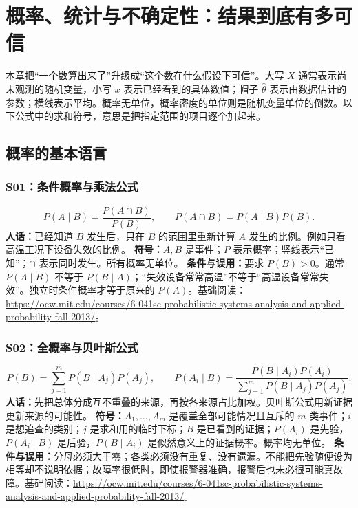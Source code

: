 \chapter{概率、统计与不确定性：结果到底有多可信}
本章把“一个数算出来了”升级成“这个数在什么假设下可信”。大写 $X$ 通常表示尚未观测的随机变量，小写 $x$ 表示已经看到的具体数值；帽子 $\hat{\theta}$ 表示由数据估计的参数；横线表示平均。概率无单位，概率密度的单位则是随机变量单位的倒数。以下公式中的求和符号，意思是把指定范围的项目逐个加起来。

\section{概率的基本语言}
\subsection{S01：条件概率与乘法公式}
\begin{equation}
 P(A\mid B)=\frac{P(A\cap B)}{P(B)},\qquad P(A\cap B)=P(A\mid B)P(B).
\end{equation}
\textbf{人话：}已经知道 $B$ 发生后，只在 $B$ 的范围里重新计算 $A$ 发生的比例。例如只看高温工况下设备失效的比例。
\textbf{符号：}$A,B$ 是事件；$P$ 表示概率；竖线表示“已知”；$\cap$ 表示同时发生。所有概率无单位。
\textbf{条件与误用：}要求 $P(B)>0$。通常 $P(A\mid B)$ 不等于 $P(B\mid A)$；“失效设备常常高温”不等于“高温设备常常失效”。独立时条件概率才等于原来的 $P(A)$。基础阅读：\url{https://ocw.mit.edu/courses/6-041sc-probabilistic-systems-analysis-and-applied-probability-fall-2013/}。

\subsection{S02：全概率与贝叶斯公式}
\begin{equation}
 P(B)=\sum_{j=1}^{m}P(B\mid A_j)P(A_j),\qquad
 P(A_i\mid B)=\frac{P(B\mid A_i)P(A_i)}{\sum_{j=1}^{m}P(B\mid A_j)P(A_j)}.
\end{equation}
\textbf{人话：}先把总体分成互不重叠的来源，再按各来源占比加权。贝叶斯公式用新证据更新来源的可能性。
\textbf{符号：}$A_1,\ldots,A_m$ 是覆盖全部可能情况且互斥的 $m$ 类事件；$i$ 是想追查的类别；$j$ 是求和用的临时下标；$B$ 是已看到的证据；$P(A_i)$ 是先验，$P(A_i\mid B)$ 是后验，$P(B\mid A_i)$ 是似然意义上的证据概率。概率均无单位。
\textbf{条件与误用：}分母必须大于零；各类必须没有重复、没有遗漏。不能把先验随便设为相等却不说明依据；故障率很低时，即使报警器准确，报警后也未必很可能真故障。基础阅读：\url{https://ocw.mit.edu/courses/6-041sc-probabilistic-systems-analysis-and-applied-probability-fall-2013/}。

